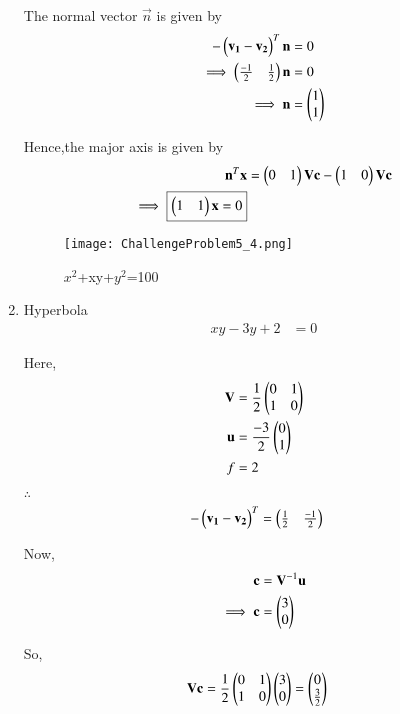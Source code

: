 \documentclass[journal,12pt,twocolumn]{IEEEtran}
\begin{document}
\begin{enumerate}
    The normal vector $\vec{n}$ is given by
    \begin{align}
        -\begin{pmatrix}\mathbf{v_1}-\mathbf{v_2}\end{pmatrix}^T\mathbf{n} &= 0
        \\
        \implies \begin{pmatrix}\frac{-1}{2} & \frac{1}{2}\end{pmatrix}\mathbf{n} &= 0
        \\
        \implies \mathbf{n} &= \begin{pmatrix}1 \\ 1\end{pmatrix}
    \end{align}
    
    Hence,the major axis is given by
    \begin{align}
        \mathbf{n}^T\mathbf{x} &= \begin{pmatrix}0 & 1\end{pmatrix}\mathbf{V}\mathbf{c} - \begin{pmatrix}1 & 0\end{pmatrix}\mathbf{V}\mathbf{c} 
        \\
        \implies \boxed{\begin{pmatrix}1 & 1\end{pmatrix}\mathbf{x} = 0}
    \end{align}
    
    \begin{figure}[!ht]
    \centering
    \texttt{[image: ChallengeProblem5\_4.png]}
    \caption{$x^2$+xy+$y^2$=100}
    \label{ex4}	
    \end{figure}
    
    \item Hyperbola
    \begin{align}
        xy-3y+2 &= 0
    \end{align}
    
    Here,
    \begin{align}
    \mathbf{V} &= \frac{1}{2}\begin{pmatrix}0 & 1 \\ 1 & 0\end{pmatrix} \\
    \mathbf{u} &= \frac{-3}{2}\begin{pmatrix}0 \\ 1\end{pmatrix} \\
    f &= 2
    \end{align}

    $\therefore$
    \begin{align}
    -\begin{pmatrix}\mathbf{v_1}-\mathbf{v_2}\end{pmatrix}^T &= \begin{pmatrix}\frac{1}{2} & \frac{-1}{2}\end{pmatrix}
    \end{align}

    Now,
    \begin{align}
    \mathbf{c} &= \mathbf{V}^{-1}\mathbf{u}\\
    \implies \mathbf{c} &= \begin{pmatrix}3 \\ 0\end{pmatrix}
    \end{align}

    So,
    \begin{align}
    \mathbf{V}\mathbf{c} &= \frac{1}{2}\begin{pmatrix}0 & 1 \\ 1 & 0\end{pmatrix}\begin{pmatrix}3 \\ 0\end{pmatrix}=\begin{pmatrix}0 \\ \frac{3}{2}\end{pmatrix}
    \end{align}


\end{enumerate}
\end{document}
